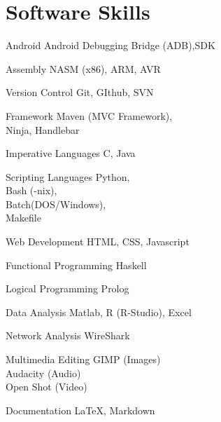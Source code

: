 \documentclass{tccv}
\begin{document}
\section{Software Skills}
	\begin{factlist}
		\item {Android}
			{Android Debugging Bridge (ADB),SDK}
		\item {Assembly}
			{NASM (x86), ARM, AVR}
		\item {Version Control}
			{Git, GIthub, SVN}
		\item{Framework}
			{Maven (MVC Framework), \\
			 Ninja, Handlebar}
		\item{Imperative Languages}
			{C, Java}
		\item{Scripting Languages}
			{Python,\\
			 Bash (-nix),\\
			 Batch(DOS/Windows), \\
			 Makefile}
		\item{Web Development}
			{HTML, CSS, Javascript}
		\item{Functional Programming}
			{Haskell}
		\item{Logical Programming}
			{Prolog}
		\item{Data Analysis}
			{Matlab, R (R-Studio), Excel}
		\item{Network Analysis}
			{WireShark}
		\item{Multimedia Editing}
			{GIMP (Images) \\
			Audacity (Audio)\\
			Open Shot (Video)} 
		\item{Documentation}
			{\LaTeX, Markdown}
	\end{factlist}


\end{document}
